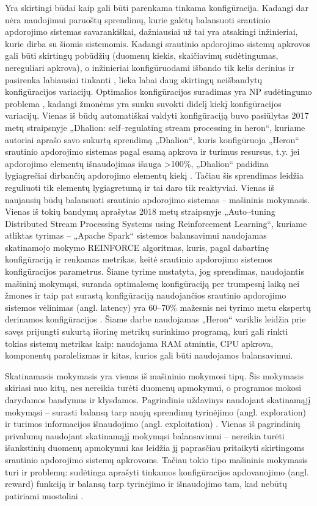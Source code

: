 \documentclass{VUMIFPSbakalaurinis}
\begin{document}
Yra skirtingi būdai kaip gali būti parenkama tinkama konfigūracija. Kadangi dar nėra naudojimui paruoštų sprendimų, kurie galėtų balansuoti srautinio apdorojimo sistemas savarankiškai, dažniausiai už tai yra atsakingi inžinieriai, kurie dirba su šiomis sistemomis. Kadangi srautinio apdorojimo sistemų apkrovos gali būti skirtingų pobūdžių (duomenų kiekis, skaičiavimų sudėtingumas, nereguliari apkrova), o inžinieriai konfigūruodami išbando tik kelis derinius ir pasirenka labiausiai tinkanti \cite{selfRegulatingStreaming}, lieka labai daug skirtingų neišbandytų konfigūracijos variacijų. Optimalios konfigūracijos suradimas yra NP sudėtingumo problema \cite{automateTuning}, kadangi žmonėms yra sunku suvokti didelį kiekį konfigūracijos variacijų. 
Vienas iš būdų automatiškai valdyti konfigūraciją buvo pasiūlytas 2017 metų straipsnyje „Dhalion: self–regulating stream processing in heron“, kuriame autoriai aprašo savo sukurtą sprendimą „Dhalion“, kuris konfigūruoja „Heron“ srautinio apdorojimo sistemas pagal esamą apkrova ir turimus resursus, t.y. jei apdorojimo elementų išnaudojimas išauga >100\%, „Dhalion“ padidina lygiagrečiai dirbančių apdorojimo elementų kiekį \cite{dhalion}. Tačiau šis sprendimas leidžia reguliuoti tik elementų lygiagretumą ir tai daro tik reaktyviai.
Vienas iš naujausių būdų balansuoti srautinio apdorojimo sistemas – mašininis mokymasis. Vienas iš tokių bandymų aprašytas 2018 metų straipsnyje „Auto–tuning Distributed Stream Processing Systems using Reinforcement Learning“, kuriame atliktas tyrimas – „Apache Spark“ sistemos balansavimui naudojamas skatinamojo mokymo REINFORCE algoritmas, kuris, pagal dabartinę konfigūraciją ir renkamas metrikas, keitė srautinio apdorojimo sistemos konfigūracijos parametrus. Šiame tyrime nustatyta, jog sprendimas, naudojantis mašininį mokymąsi, suranda optimalesnę konfigūraciją per trumpesnį laiką nei žmones ir taip pat surastą konfigūraciją naudojančios srautinio apdorojimo sistemos vėlinimas (angl. latency) yra 60–70\% mažesnis nei tyrimo metu ekspertų derinamos konfigūracijos \cite{vaquero2018autotuning}. Šiame darbe naudojamas „Heron“ variklis leidžia prie savęs prijungti sukurtą išorinę metrikų surinkimo programą, kuri gali rinkti tokias sistemų metrikas kaip: naudojama RAM atmintis, CPU apkrova, komponentų paralelizmas ir kitas, kurios gali būti naudojamos balansavimui. 

Skatinamasis mokymasis yra vienas iš mašininio mokymosi tipų. Šis mokymasis skiriasi nuo kitų, nes nereikia turėti duomenų apmokymui, o programos mokosi darydamos bandymus ir klysdamos. Pagrindinis uždavinys naudojant skatinamąjį mokymąsi – surasti balansą tarp naujų sprendimų tyrinėjimo (angl. exploration) ir turimos informacijos išnaudojimo (angl. exploitation) \cite{reinforcment}. Vienas iš pagrindinių privalumų naudojant skatinamąjį mokymąsi balansavimui – nereikia turėti išankstinių duomenų apmokymui kas leidžia jį paprasčiau pritaikyti skirtingoms srautinio apdorojimo sistemų apkrovoms. Tačiau tokio tipo mašininis mokymasis turi ir problemų: sudėtinga aprašyti tinkamos konfigūracijos apdovanojimo (angl. reward) funkciją ir balansą tarp tyrinėjimo ir išnaudojimo tam, kad nebūtų patiriami nuostoliai \cite{selfRegulatingStreaming}.
\end{document}
